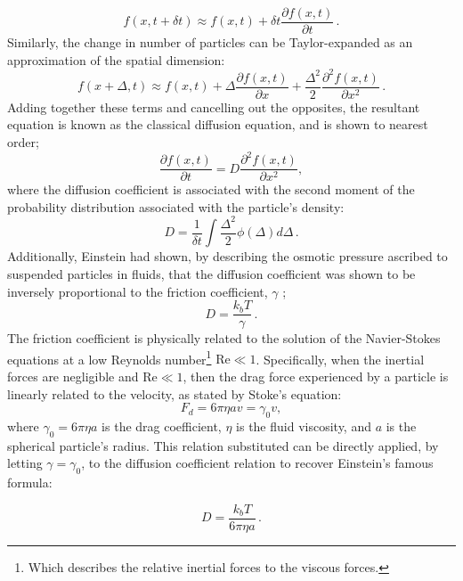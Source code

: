\begin{equation}
	f(x, t + \delta t) \approx f(x,t) + \delta t\frac{\partial f(x,t)}{\partial t} \,.
\end{equation}
Similarly, the change in number of particles can be Taylor-expanded as an approximation of the spatial dimension:
\begin{equation}
	f(x + \Delta, t) \approx f(x,t) + \Delta \frac{\partial f(x,t)}{\partial x}  + \frac{\Delta^2}{2}\frac{\partial^2 f(x,t)}{\partial x^2} \,.
\end{equation}
Adding together these terms and cancelling out the opposites, the resultant equation is known as the classical diffusion equation, and is shown to nearest order;
\begin{equation}\label{eqn:diffusionpde}
	\frac{\partial f(x,t)}{\partial t} = D \frac{\partial^2 f(x,t)}{\partial x^2},
\end{equation}
where the diffusion coefficient is associated with the second moment of the probability distribution associated with the particle's density:
\begin{equation}
	D = \frac{1}{\delta t}\int \frac{\Delta^2}{2} \phi(\Delta) d\Delta \,.
\end{equation}
Additionally, Einstein had shown, by describing the osmotic pressure ascribed to suspended particles in fluids, that the diffusion coefficient was shown to be inversely proportional to the friction coefficient, $\gamma$ \cite{einstein1956investigations};
\begin{equation}
D = \frac{k_b T}{\gamma}\,.
\end{equation}
The friction coefficient is physically related to the solution of the Navier-Stokes equations at a low Reynolds number\footnote{Which describes the relative inertial forces to the viscous forces.} $\mathrm{Re} \ll 1$. Specifically, when the inertial forces are negligible and $\mathrm{Re} \ll 1$, then the drag force experienced by a particle is linearly related to the velocity, as stated by Stoke's equation:
\begin{equation}
	F_d = 6 \pi \eta a v = \gamma_0 v,
\end{equation}
where $\gamma_0 = 6 \pi \eta a$ is the drag coefficient, $\eta$ is the fluid viscosity, and $a$ is the spherical particle's radius. This relation substituted can be directly applied, by letting $\gamma = \gamma_0$, to the diffusion coefficient relation to recover Einstein's famous formula:
 
\begin{equation}\label{eqn:stokes-einstein}
	D = \frac{k_bT}{6 \pi \eta a} \,.
\end{equation}

